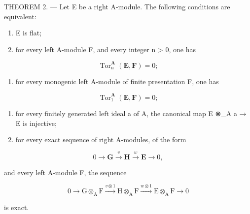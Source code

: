 THEOREM 2. --- Let E be a right A-module. The following conditions are equivalent:

\begin{enumerate}
\def\labelenumi{(\roman{enumi})}
\item
  E is flat;
\item
  for every left A-module F, and every integer n \textgreater{} 0, one has
\end{enumerate}

\[
\operatorname{Tor} _ {n} ^ {\mathbf {A}} (\mathbf {E}, \mathbf {F}) = 0;
\]

\begin{enumerate}
\def\labelenumi{(\roman{enumi})}
\setcounter{enumi}{2}
\tightlist
\item
  for every monogenic left A-module of finite presentation F, one has
\end{enumerate}

\[
\operatorname{Tor} _ {1} ^ {\mathbf {A}} (\mathbf {E}, \mathbf {F}) = 0;
\]

\begin{enumerate}
\def\labelenumi{(\roman{enumi})}
\setcounter{enumi}{3}
\item
  for every finitely generated left ideal a of A, the canonical map E ⊗\_A a → E is injective;
\item
  for every exact sequence of right A-modules, of the form
\end{enumerate}

\[
0 \rightarrow \mathbf {G} \xrightarrow {v} \mathbf {H} \xrightarrow {w} \mathbf {E} \rightarrow 0,
\]

and every left A-module F, the sequence

\[
0 \longrightarrow \mathrm{G} \otimes_ {\mathrm{A}} \mathrm{F} \xrightarrow {v \otimes 1} \mathrm{H} \otimes_ {\mathrm{A}} \mathrm{F} \xrightarrow {w \otimes 1} \mathrm{E} \otimes_ {\mathrm{A}} \mathrm{F} \longrightarrow 0
\]

is exact.

